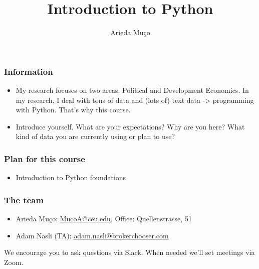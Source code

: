 \documentclass[compress, aspectratio=54]{beamer}
\title[Introduction]{Introduction to Python}
\author[Arieda Mu\c co]{Arieda Mu\c co}
\institute[CEU]{Central European University}
\date{}
\begin{document}
\captionsetup[subfigure]{labelformat=empty}

\frame{\titlepage}



\begin{frame}
\frametitle{Information}
\begin{itemize}
\item My research focuses on two areas: Political and Development Economics. In my research, I deal with tons of data and (lots of) text data -> programming with Python. That's why this course.
\item Introduce yourself. What are your expectations? Why are you here? What kind of data you are currently using or plan to use? 
\end{itemize}
\end{frame}

\begin{frame}
\frametitle{Plan for this course}
\begin{itemize}
\item Introduction to Python foundations
\end{itemize}
\end{frame}

\begin{frame}
\frametitle{The team }
\begin{itemize}
\item Arieda Mu\c co: \href{mailto:MucoA@ceu.edu}{MucoA@ceu.edu}. Office: Quellenstrasse,  51\\
\item Adam Nasli (TA): \href{mailto:adam.nasli@brokerchooser.com}{adam.nasli@brokerchooser.com}\\
\begin{figure}%
   
        \qquad
\end{figure}
\end{itemize}
We encourage you to ask questions via Slack. When needed we'll set meetings via Zoom.

\end{frame}
\end{document}
